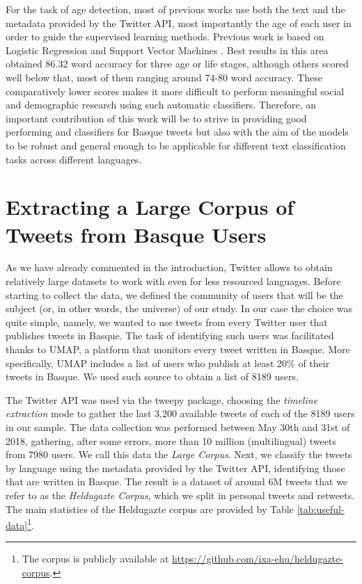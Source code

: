 \documentclass[information,article,submit,moreauthors,pdftex,10pt,a4paper]{Definitions/mdpi}
\begin{document}
For the task of age detection, most of previous works use both the text and the metadata provided by the Twitter API, most importantly the age of each user in order to guide the supervised learning methods. Previous work is based on Logistic Regression \cite{nguyen2013old,morgan2017predicting} and Support Vector Machines \cite{rao2010classifying,al2012homophily,marquardt2014age}. Best results in this area obtained 86.32 word accuracy \cite{nguyen2013old} for three age or life stages, although others scored well below that, most of them ranging around 74-80 word accuracy. These comparatively lower scores makes it more difficult to perform meaningful social and demographic research using such automatic classifiers. Therefore, an important contribution of this work will be to strive in providing good performing and classifiers for Basque tweets but also with the aim of the models to be robust and general enough to be applicable for different text classification tasks across different languages.



\section{Extracting a Large Corpus of Tweets from Basque Users}\label{sec:data-extraction}

As we have already commented in the introduction, Twitter allows to obtain relatively large datasets to work with even for less resourced languages. Before starting to collect the data, we defined the community of users that will be the subject (or, in other words, the universe) of our study. In our case the choice was quite simple, namely, we wanted to use tweets from every Twitter user that publishes tweets in Basque. The task of identifying such users was facilitated thanks to UMAP, a platform that monitors every tweet written in Basque. More specifically, UMAP includes a list of users who publish at least 20\% of their tweets in Basque. We used such source to obtain a list of 8189 users.

The Twitter API was used via the tweepy package, choosing the \textit{timeline extraction} mode to gather the last 3,200 available tweets of each of the 8189 users in our sample. The data collection was performed between May 30th and 31st of 2018, gathering, after some errors, more than 10 million (multilingual) tweets from 7980 users. We call this data the \emph{Large Corpus}. Next, we classify the tweets by language using the metadata provided by the Twitter API, identifying those that are written in Basque. The result is a dataset of around 6M tweets that we refer to as the \emph{Heldugazte Corpus}, which we split in personal tweets and retweets. The main statistics of the Heldugazte corpus are provided by Table \ref{tab:useful-data}\footnote{The corpus is publicly available at \url{https://github.com/ixa-ehu/heldugazte-corpus}.}.
\end{document}
